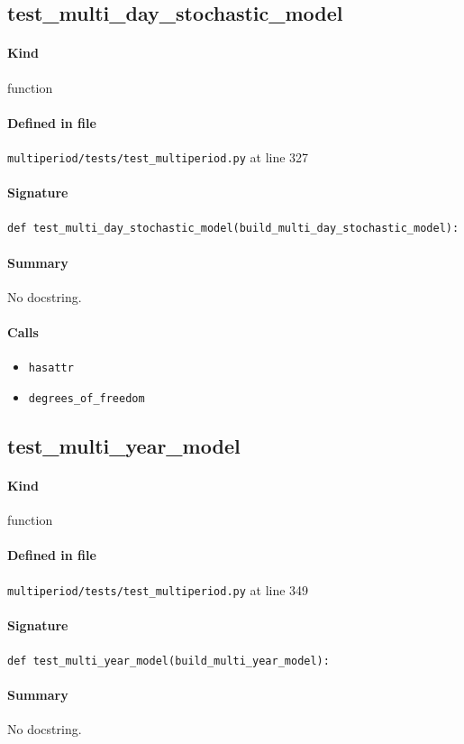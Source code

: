 \documentclass[11pt]{report}
\begin{document}
\subsection{test\_multi\_day\_stochastic\_model}
\label{def:multiperiod-tests-test_multiperiod.py:test_multi_day_stochastic_model:L327}
\paragraph{Kind} function
\paragraph{Defined in file} \texttt{multiperiod/tests/test\_multiperiod.py} at line 327
\paragraph{Signature} \texttt{def test\_multi\_day\_stochastic\_model(build\_multi\_day\_stochastic\_model):}
\paragraph{Summary} No docstring.
\paragraph{Calls}
\begin{itemize}[leftmargin=*]
  \item \texttt{hasattr}
  \item \texttt{degrees\_of\_freedom}
\end{itemize}
\subsection{test\_multi\_year\_model}
\label{def:multiperiod-tests-test_multiperiod.py:test_multi_year_model:L349}
\paragraph{Kind} function
\paragraph{Defined in file} \texttt{multiperiod/tests/test\_multiperiod.py} at line 349
\paragraph{Signature} \texttt{def test\_multi\_year\_model(build\_multi\_year\_model):}
\paragraph{Summary} No docstring.
\end{document}
